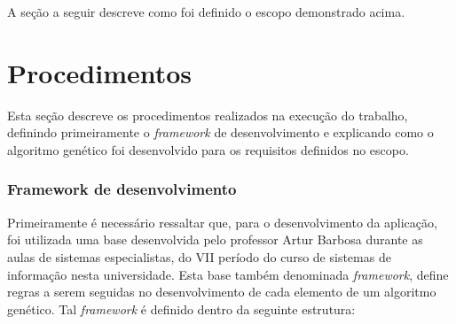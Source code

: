 \par A seção a seguir descreve como foi definido o escopo demonstrado acima.



\section{Procedimentos}

\par Esta seção descreve os procedimentos realizados na execução do trabalho,
definindo primeiramente o \textit{framework} de desenvolvimento e explicando
como o algoritmo genético foi desenvolvido para os requisitos definidos no escopo.

\subsubsection{Framework de desenvolvimento}
\par Primeiramente é necessário ressaltar que, para o desenvolvimento da aplicação, foi utilizada uma base desenvolvida pelo professor Artur Barbosa durante as aulas de sistemas especialistas, do VII período do curso de sistemas de informação nesta universidade.
Esta base também denominada \textit{framework}, define regras a serem seguidas no desenvolvimento de cada elemento
de um algoritmo genético. Tal \textit{framework} é definido dentro da seguinte estrutura:

